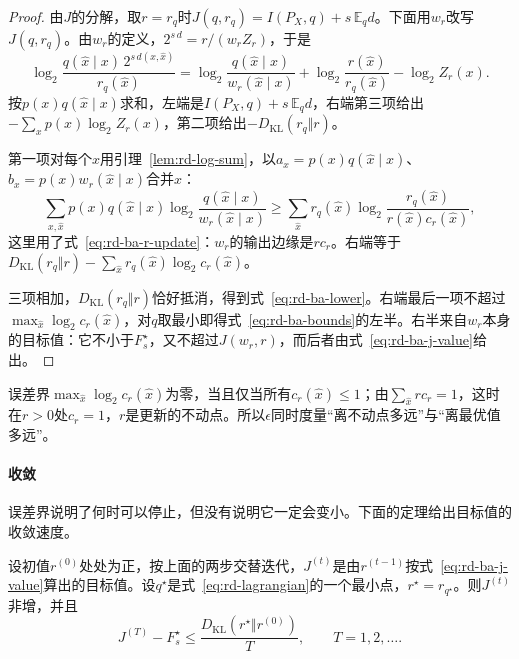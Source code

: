 \begin{proof}
由$J$的分解，取$r=r_q$时$J(q,r_q)=I(P_X,q)+s\,\mathbb{E}_qd$。下面用$w_r$改写$J(q,r_q)$。由$w_r$的定义，$2^{s\,d}=r/(w_rZ_r)$，于是
\[
  \log_2\frac{q(\hat{x}\mid x)\,2^{s\,d(x,\hat{x})}}{r_q(\hat{x})}
  =\log_2\frac{q(\hat{x}\mid x)}{w_r(\hat{x}\mid x)}+\log_2\frac{r(\hat{x})}{r_q(\hat{x})}-\log_2Z_r(x).
\]
按$p(x)q(\hat{x}\mid x)$求和，左端是$I(P_X,q)+s\,\mathbb{E}_qd$，右端第三项给出$-\sum_xp(x)\log_2Z_r(x)$，第二项给出$-D_{\mathrm{KL}}(r_q\Vert r)$。

第一项对每个$\hat{x}$用引理~\ref{lem:rd-log-sum}，以$a_x=p(x)q(\hat{x}\mid x)$、$b_x=p(x)w_r(\hat{x}\mid x)$合并$x$：
\[
  \sum_{x,\hat{x}}p(x)q(\hat{x}\mid x)\log_2\frac{q(\hat{x}\mid x)}{w_r(\hat{x}\mid x)}
  \geq\sum_{\hat{x}}r_q(\hat{x})\log_2\frac{r_q(\hat{x})}{r(\hat{x})c_r(\hat{x})},
\]
这里用了式~\eqref{eq:rd-ba-r-update}：$w_r$的输出边缘是$rc_r$。右端等于$D_{\mathrm{KL}}(r_q\Vert r)-\sum_{\hat{x}}r_q(\hat{x})\log_2c_r(\hat{x})$。

三项相加，$D_{\mathrm{KL}}(r_q\Vert r)$恰好抵消，得到式~\eqref{eq:rd-ba-lower}。右端最后一项不超过$\max_{\hat{x}}\log_2c_r(\hat{x})$，对$q$取最小即得式~\eqref{eq:rd-ba-bounds}的左半。右半来自$w_r$本身的目标值：它不小于$F_s^{\star}$，又不超过$J(w_r,r)$，而后者由式~\eqref{eq:rd-ba-j-value}给出。
\end{proof}

误差界$\max_{\hat{x}}\log_2c_r(\hat{x})$为零，当且仅当所有$c_r(\hat{x})\leq1$；由$\sum_{\hat{x}}rc_r=1$，这时在$r>0$处$c_r=1$，$r$是更新的不动点。所以$\epsilon$同时度量“离不动点多远”与“离最优值多远”。

\paragraph{收敛}
误差界说明了何时可以停止，但没有说明它一定会变小。下面的定理给出目标值的收敛速度。

\begin{theorem}[目标值的收敛]
\label{thm:rd-ba-convergence}
设初值$r^{(0)}$处处为正，按上面的两步交替迭代，$J^{(t)}$是由$r^{(t-1)}$按式~\eqref{eq:rd-ba-j-value}算出的目标值。设$q^{\star}$是式~\eqref{eq:rd-lagrangian}的一个最小点，$r^{\star}=r_{q^{\star}}$。则$J^{(t)}$非增，并且
\begin{equation}
  J^{(T)}-F_s^{\star}\leq\frac{D_{\mathrm{KL}}(r^{\star}\Vert r^{(0)})}{T},\qquad T=1,2,\dots .
  \label{eq:rd-ba-rate}
\end{equation}
\end{theorem}

